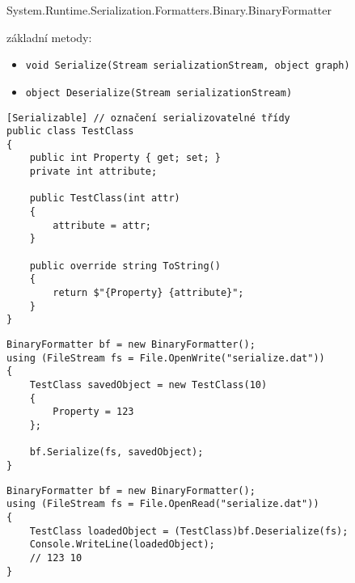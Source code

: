\begin{frame}[fragile]
\begin{bitemize}{System.Runtime.Serialization.Formatters.Binary.BinaryFormatter}
\item základní metody:
\begin{itemize}
\item \lstinline|void Serialize(Stream serializationStream, object graph)|
\item \lstinline|object Deserialize(Stream serializationStream)|
\end{itemize}

\end{bitemize}
\end{frame}

\begin{frame}[fragile]
\begin{yesblock}
\begin{lstlisting}
[Serializable] // označení serializovatelné třídy
public class TestClass
{
    public int Property { get; set; }
    private int attribute;

    public TestClass(int attr)
    {
        attribute = attr;
    }

    public override string ToString()
    {
        return $"{Property} {attribute}";
    }
}
\end{lstlisting}
\end{yesblock}
\end{frame}



\begin{frame}[fragile]
\begin{yesblock}
\begin{lstlisting}
BinaryFormatter bf = new BinaryFormatter();
using (FileStream fs = File.OpenWrite("serialize.dat"))
{
    TestClass savedObject = new TestClass(10)
    {
        Property = 123
    };

    bf.Serialize(fs, savedObject);
}
\end{lstlisting}
\end{yesblock}
\vfill
\begin{yesblock}
\begin{lstlisting}
BinaryFormatter bf = new BinaryFormatter();
using (FileStream fs = File.OpenRead("serialize.dat"))
{
    TestClass loadedObject = (TestClass)bf.Deserialize(fs);
    Console.WriteLine(loadedObject);
    // 123 10
}
\end{lstlisting}
\end{yesblock}
\end{frame}



